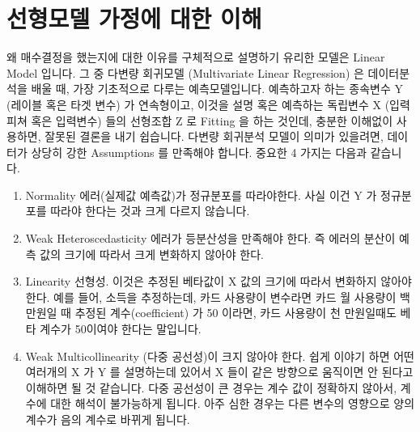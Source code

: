 \documentclass[letterpaper,10pt,english]{jupyterBook}
\begin{document}
\part{선형모델 가정에 대한 이해}
\label{\detokenize{chapter5/5.2.4_LM_Assumptions:id1}}\label{\detokenize{chapter5/5.2.4_LM_Assumptions::doc}}
\sphinxAtStartPar
왜 매수결정을 했는지에 대한 이유를 구체적으로 설명하기 유리한 모델은 Linear Model 입니다. 그 중 다변량 회귀모델 (Multivariate Linear Regression) 은 데이터분석을 배울 때, 가장 기초적으로 다루는 예측모델입니다. 예측하고자 하는 종속변수 Y (레이블 혹은 타겟 변수) 가 연속형이고, 이것을 설명 혹은 예측하는 독립변수 X (입력피쳐 혹은 입력변수) 들의 선형조합 Z 로 Fitting 을 하는 것인데, 충분한 이해없이 사용하면, 잘못된 결론을 내기 쉽습니다. 다변량 회귀분석 모델이 의미가 있을려면, 데이터가 상당히 강한 Assumptions 를 만족해야 합니다. 중요한 4 가지는 다음과 같습니다.
\begin{enumerate}
%
\item {} 
\sphinxAtStartPar
Normality \sphinxhyphen{} 에러(실제값 \sphinxhyphen{} 예측값)가 정규분포를 따라야한다. 사실 이건 Y 가 정규분포를 따라야 한다는 것과 크게 다르지 않습니다.

\item {} 
\sphinxAtStartPar
Weak Heteroscedasticity \sphinxhyphen{} 에러가 등분산성을 만족해야 한다. 즉 에러의 분산이 예측 값의 크기에 따라서 크게 변화하지 않아야 한다.

\item {} 
\sphinxAtStartPar
Linearity \sphinxhyphen{} 선형성. 이것은 추정된 베타값이 X 값의 크기에 따라서 변화하지 않아야 한다. 예를 들어, 소득을 추정하는데, 카드 사용량이 변수라면 카드 월 사용량이 백만원일 때 추정된 계수(coefficient) 가 50 이라면, 카드 사용량이 천 만원일때도 베타 계수가 50이여야 한다는 말입니다.

\item {} 
\sphinxAtStartPar
Weak Multicollinearity \sphinxhyphen{} (다중 공선성)이 크지 않아야 한다. 쉽게 이야기 하면 어떤 여러개의 X 가 Y 를 설명하는데 있어서 X 들이 같은 방향으로 움직이면 안 된다고 이해하면 될 것 같습니다. 다중 공선성이 큰 경우는 계수 값이 정확하지 않아서, 계수에 대한 해석이 불가능하게 됩니다. 아주 심한 경우는 다른 변수의 영향으로 양의 계수가 음의 계수로 바뀌게 됩니다.

\end{enumerate}
\end{document}
